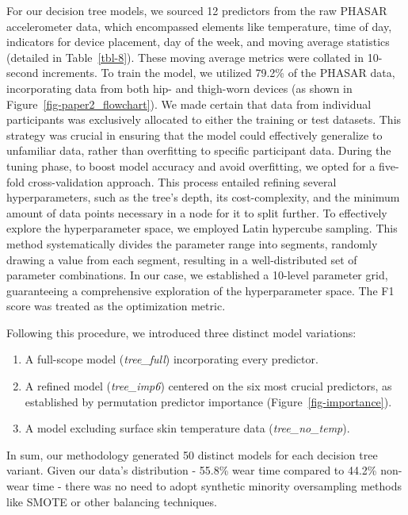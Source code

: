 \documentclass[
  10pt,
]{scrbook}
\begin{document}
For our decision tree models, we sourced 12 predictors from the raw
PHASAR accelerometer data, which encompassed elements like temperature,
time of day, indicators for device placement, day of the week, and
moving average statistics (detailed in Table~\ref{tbl-8}). These moving
average metrics were collated in 10-second increments. To train the
model, we utilized 79.2\% of the PHASAR data, incorporating data from
both hip- and thigh-worn devices (as shown in
Figure~\ref{fig-paper2_flowchart}). We made certain that data from
individual participants was exclusively allocated to either the training
or test datasets. This strategy was crucial in ensuring that the model
could effectively generalize to unfamiliar data, rather than overfitting
to specific participant data. During the tuning phase, to boost model
accuracy and avoid overfitting, we opted for a five-fold
cross-validation approach. This process entailed refining several
hyperparameters, such as the tree's depth, its cost-complexity, and the
minimum amount of data points necessary in a node for it to split
further. To effectively explore the hyperparameter space, we employed
Latin hypercube sampling. This method systematically divides the
parameter range into segments, randomly drawing a value from each
segment, resulting in a well-distributed set of parameter combinations.
In our case, we established a 10-level parameter grid, guaranteeing a
comprehensive exploration of the hyperparameter space. The F1 score was
treated as the optimization metric.

Following this procedure, we introduced three distinct model variations:

\begin{enumerate}
\def\labelenumi{\arabic{enumi}.}
\item
  A full-scope model (\emph{tree\_full}) incorporating every predictor.
\item
  A refined model (\emph{tree\_imp6}) centered on the six most crucial
  predictors, as established by permutation predictor importance
  (Figure~\ref{fig-importance}).
\item
  A model excluding surface skin temperature data
  (\emph{tree\_no\_temp}).
\end{enumerate}

In sum, our methodology generated 50 distinct models for each decision
tree variant. Given our data's distribution - 55.8\% wear time compared
to 44.2\% non-wear time - there was no need to adopt synthetic minority
oversampling methods like SMOTE or other balancing techniques.
\end{document}
